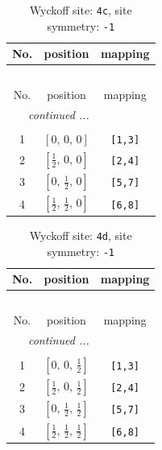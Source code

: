 \documentclass[fleqn,8pt]{jsarticle}
\begin{document}
\renewcommand{\arraystretch}{1.2}
\begin{longtable}{ccc}
\caption{Wyckoff site: {\tt 4c}, site symmetry: {\tt -1}}
 \\
 \hline \hline
No. & position & mapping \\ \hline \endfirsthead

\multicolumn{2}{l}{\tablename\ \thetable{}} \\
 \hline \hline
No. & position & mapping \\ \hline \endhead

 \hline \hline
\multicolumn{2}{r}{\footnotesize\it continued ...} \\ \endfoot

 \hline \hline
\multicolumn{2}{r}{} \\ \endlastfoot

1 & $\left[ 0,\, 0,\, 0 \right]$ & {\tt [1,3]} \\ \hline
2 & $\left[ \frac{1}{2},\, 0,\, 0 \right]$ & {\tt [2,4]} \\ \hline
3 & $\left[ 0,\, \frac{1}{2},\, 0 \right]$ & {\tt [5,7]} \\ \hline
4 & $\left[ \frac{1}{2},\, \frac{1}{2},\, 0 \right]$ & {\tt [6,8]} \\
\end{longtable}
\renewcommand{\arraystretch}{1.2}
\begin{longtable}{ccc}
\caption{Wyckoff site: {\tt 4d}, site symmetry: {\tt -1}}
 \\
 \hline \hline
No. & position & mapping \\ \hline \endfirsthead

\multicolumn{2}{l}{\tablename\ \thetable{}} \\
 \hline \hline
No. & position & mapping \\ \hline \endhead

 \hline \hline
\multicolumn{2}{r}{\footnotesize\it continued ...} \\ \endfoot

 \hline \hline
\multicolumn{2}{r}{} \\ \endlastfoot

1 & $\left[ 0,\, 0,\, \frac{1}{2} \right]$ & {\tt [1,3]} \\ \hline
2 & $\left[ \frac{1}{2},\, 0,\, \frac{1}{2} \right]$ & {\tt [2,4]} \\ \hline
3 & $\left[ 0,\, \frac{1}{2},\, \frac{1}{2} \right]$ & {\tt [5,7]} \\ \hline
4 & $\left[ \frac{1}{2},\, \frac{1}{2},\, \frac{1}{2} \right]$ & {\tt [6,8]} \\
\end{longtable}
\end{document}
